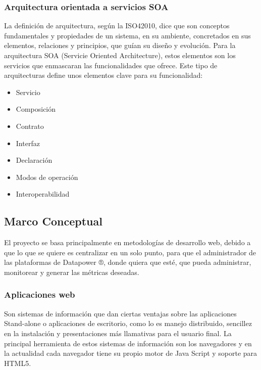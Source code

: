 \subsubsection{Arquitectura orientada a servicios SOA}
La definición de arquitectura, según la ISO42010, dice que son conceptos fundamentales y propiedades de un sistema, en su ambiente, concretados en sus elementos, relaciones y principios, que guían su diseño y evolución. Para la arquitectura SOA (Servicie Oriented Architecture), estos elementos son los servicios que enmascaran las funcionalidades que ofrece. 
\newline
Este tipo de arquitecturas define unos elementos clave para su funcionalidad:
\begin{itemize}
    \item Servicio
    \item Composición
    \item Contrato
    \item Interfaz
    \item Declaración
    \item Modos de operación
    \item Interoperabilidad
\end{itemize}
\subsection{Marco Conceptual}
El proyecto se basa principalmente en metodologías de desarrollo web, debido a que lo que se quiere es centralizar en un solo punto, para que el administrador de las plataformas de Datapower ®, donde quiera que esté, que pueda administrar, monitorear y generar las métricas deseadas.
\subsubsection{Aplicaciones web}
Son sistemas de información que dan ciertas ventajas sobre las aplicaciones Stand-alone o aplicaciones de escritorio, como lo es manejo distribuido, sencillez en la instalación y presentaciones más llamativas para el usuario final. La principal herramienta de estos sistemas de información son los navegadores y en la actualidad cada navegador tiene su propio motor de Java Script y soporte para HTML5.
